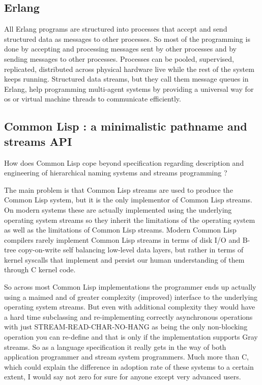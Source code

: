 \documentclass[sigconf]{acmart}
\begin{document}
\subsection{Erlang}
All Erlang programs are structured into processes that accept and send
structured data as messages to other processes. So most of the
programming is done by accepting and processing messages sent by other
processes and by sending messages to other processes. Processes can be
pooled, supervised, replicated, distributed across physical hardware
live while the rest of the system keeps running. Structured data
streams, but they call them message queues in Erlang, help programming
multi-agent systems by providing a universal way for os or virtual
machine threads to communicate efficiently.

\subsection{Common Lisp : a minimalistic pathname and streams API}
How does Common Lisp cope beyond specification regarding description
and engineering of hierarchical naming systems and streams programming
?

The main problem is that Common Lisp streams are used to produce the
Common Lisp system, but it is the only implementor of Common Lisp
streams. On modern systems these are actually implemented using the
underlying operating system streams so they inherit the limitations of
the operating system as well as the limitations of Common Lisp
streams. Modern Common Lisp compilers rarely implement Common Lisp
streams in terms of disk I/O and B-tree copy-on-write self balancing
low-level data layers, but rather in terms of kernel syscalls that
implement and persist our human understanding of them through C kernel
code.

So across most Common Lisp implementations the programmer ends up
actually using a maimed and of greater complexity (improved) interface
to the underlying operating system streams. But even with additional
complexity they would have a hard time subclassing and re-implementing
correctly asynchronous operations with just STREAM-READ-CHAR-NO-HANG
as being the only non-blocking operation you can re-define and that is
only if the implementation supports Gray streams. So as a language
specification it really gets in the way of both application programmer
and stream system programmers. Much more than C, which could explain
the difference in adoption rate of these systems to a certain extent,
I would say not zero for sure for anyone except very advanced users.


\


\end{document}
